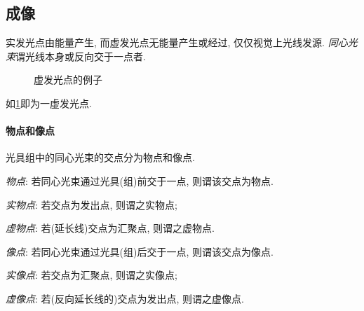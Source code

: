 \documentclass{ctexart}
\begin{document}

\subsection{成像} %
\label{sub:成像}

实发光点由能量产生, 而虚发光点无能量产生或经过, 仅仅视觉上光线发源. \emph{同心光束}谓光线本身或反向交于一点者.
\begin{figure}[ht]
    \centering
    \caption{虚发光点的例子}
    \label{fig:虚发光点的例子}
\end{figure}
\begin{sample}
    \begin{ex}
        如\cref{fig:虚发光点的例子}即为一虚发光点.
    \end{ex}
\end{sample}
\paragraph{物点和像点} %
\label{par:物点和像点}

光具组中的同心光束的交点分为物点和像点.
\begin{cenum}
    \item \emph{物点}: 若同心光束通过光具(组)前交于一点, 则谓该交点为物点.
    \begin{cenum}
        \item \emph{实物点}: 若交点为发出点, 则谓之实物点;
        \item \emph{虚物点}: 若(延长线)交点为汇聚点, 则谓之虚物点.
    \end{cenum}
    \item \emph{像点}: 若同心光束通过光具(组)后交于一点, 则谓该交点为像点.
    \begin{cenum}
        \item \emph{实像点}: 若交点为汇聚点, 则谓之实像点;
        \item \emph{虚像点}: 若(反向延长线的)交点为发出点, 则谓之虚像点.
    \end{cenum}
\end{cenum}
\end{document}
